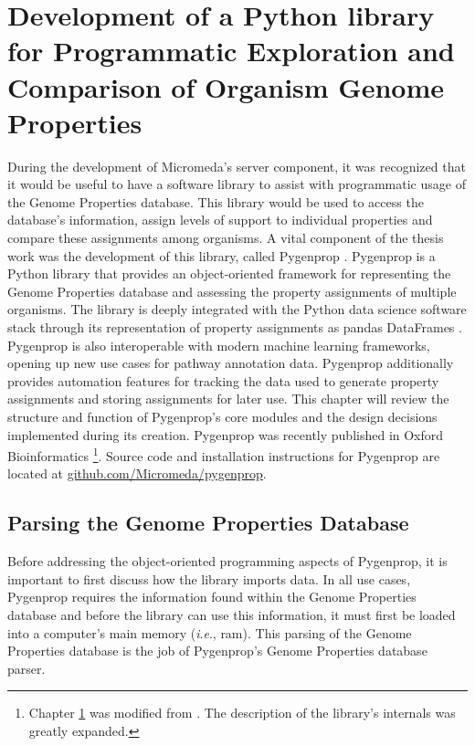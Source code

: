 \chapter{Development of a Python library for Programmatic Exploration and 
Comparison of Organism Genome Properties} \label{Pygenprop}

During the development of Micromeda's server component, it was recognized that 
it would be useful to have a software library to assist with programmatic usage 
of the Genome Properties database. This library would be used to access the 
database's information, assign levels of support to individual properties and 
compare these assignments among organisms. A vital component of the thesis work 
was the development of this library, called Pygenprop 
\cite{bergstrand2019pygenprop}. Pygenprop is a Python library that provides an 
object-oriented framework \cite{booch1986object} for representing the Genome 
Properties database and assessing the property assignments of multiple 
organisms. The library is deeply integrated with the Python data science 
software stack \cite{scipystack} through its representation of property 
assignments as pandas DataFrames \cite{mckinney2010data}. Pygenprop is also 
interoperable with modern machine learning frameworks, opening up new use cases 
for pathway annotation data. Pygenprop additionally provides automation features 
for tracking the data used to generate property assignments and storing 
assignments for later use. This chapter will review the structure and function 
of Pygenprop's core modules and the design decisions implemented during its 
creation. Pygenprop was recently published in Oxford Bioinformatics 
\cite{bergstrand2019pygenprop}\footnote{Chapter \ref{Pygenprop} was modified 
from \cite{bergstrand2019pygenprop}. The description of the library's internals 
was greatly expanded.}. Source code and installation instructions for Pygenprop are 
located at 
\href{https://github.com/Micromeda/pygenprop}{github.com/Micromeda/pygenprop}.

\section{Parsing the Genome Properties Database} 
\label{genome-properties-parser}

Before addressing the object-oriented programming aspects of Pygenprop, it is 
important to first discuss how the library imports data. In all use cases, 
Pygenprop requires the information found within the Genome Properties database 
and before the library can use this information, it must first be loaded into a 
computer's main memory (\textit{i}.\textit{e}., \gls{ram}). This parsing of the 
Genome Properties database is the job of Pygenprop's Genome Properties database 
parser.

